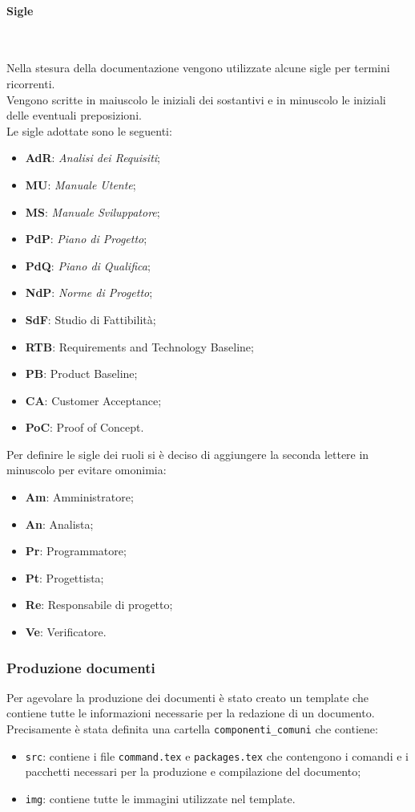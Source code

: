 \paragraph{Sigle} ~

Nella stesura della documentazione vengono utilizzate alcune sigle per termini ricorrenti. \\
Vengono scritte in maiuscolo le iniziali dei sostantivi e in minuscolo le iniziali delle eventuali preposizioni. \\
Le sigle adottate sono le seguenti:
\begin{itemize}
    \item \textbf{AdR}: \textit{Analisi dei Requisiti};
    \item \textbf{MU}: \textit{Manuale Utente};
    \item \textbf{MS}: \textit{Manuale Sviluppatore};
    \item \textbf{PdP}: \textit{Piano di Progetto};
    \item \textbf{PdQ}: \textit{Piano di Qualifica};
    \item \textbf{NdP}: \textit{Norme di Progetto};
    \item \textbf{SdF}: Studio di Fattibilità;
    \item \textbf{RTB}: Requirements and Technology Baseline;
    \item \textbf{PB}: Product Baseline;
    \item \textbf{CA}: Customer Acceptance;
    \item \textbf{PoC}: Proof of Concept.
\end{itemize}

Per definire le sigle dei ruoli si è deciso di aggiungere la seconda lettere in minuscolo per evitare omonimia:
\begin{itemize}
    \item \textbf{Am}: Amministratore;
    \item \textbf{An}: Analista;
    \item \textbf{Pr}: Programmatore;
    \item \textbf{Pt}: Progettista;
    \item \textbf{Re}: Responsabile di progetto;
    \item \textbf{Ve}: Verificatore.
\end{itemize}

\subsubsection{Produzione documenti}
Per agevolare la produzione dei documenti è stato creato un template che contiene tutte le informazioni necessarie per la redazione di un documento.\\
Precisamente è stata definita una cartella \texttt{componenti\_comuni} che contiene:
\begin{itemize}
    \item \texttt{src}: contiene i file \texttt{command.tex} e \texttt{packages.tex} che contengono i comandi e i pacchetti necessari per la produzione e compilazione del documento;
    \item \texttt{img}: contiene tutte le immagini utilizzate nel template.
\end{itemize}


